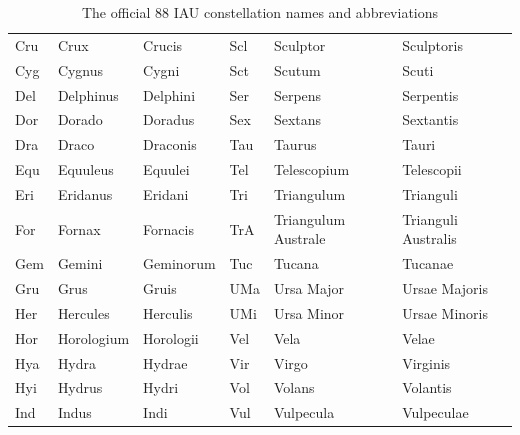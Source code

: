 \begin{table}[p]
\begin{tabular}{lll||lll}
Cru & Crux                 & Crucis                & Scl & Sculptor             & Sculptoris            \\
Cyg & Cygnus               & Cygni                 & Sct & Scutum               & Scuti                 \\
Del & Delphinus            & Delphini              & Ser & Serpens              & Serpentis             \\
Dor & Dorado               & Doradus               & Sex & Sextans              & Sextantis             \\
Dra & Draco                & Draconis              & Tau & Taurus               & Tauri                 \\
Equ & Equuleus             & Equulei               & Tel & Telescopium          & Telescopii            \\
Eri & Eridanus             & Eridani               & Tri & Triangulum           & Trianguli             \\
For & Fornax               & Fornacis              & TrA & Triangulum Australe  & Trianguli Australis   \\
Gem & Gemini               & Geminorum             & Tuc & Tucana               & Tucanae               \\
Gru & Grus                 & Gruis                 & UMa & Ursa Major           & Ursae Majoris         \\
Her & Hercules             & Herculis              & UMi & Ursa Minor           & Ursae Minoris         \\
Hor & Horologium           & Horologii             & Vel & Vela                 & Velae                 \\
Hya & Hydra                & Hydrae                & Vir & Virgo                & Virginis              \\
Hyi & Hydrus               & Hydri                 & Vol & Volans               & Volantis              \\
Ind & Indus                & Indi                  & Vul & Vulpecula            & Vulpeculae            \\
\bottomrule
  \end{tabular}
  \caption{The official 88 IAU constellation names and abbreviations}
  \label{tab:IAUConstellations}
\end{table}



